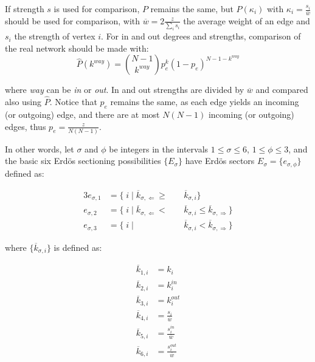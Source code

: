 \documentclass[%
 aip,
 jmp,%
 amsmath,amssymb,
 reprint,%
]{revtex4-1}
\begin{document}
If strength $s$ is used for comparison, $P$ remains the same, but $P(\kappa_i)$ with $\kappa_i=\frac{s_i}{\overline{w}}$ should be used for comparison, with $\overline{w}=2\frac{z}{\sum_is_i}$ the average weight of an edge and $s_i$ the strength of vertex $i$. For in and out degrees and strengths, comparison of the real network should be made with:
\begin{equation}
\hat{P}(k^{way})=\binom{N-1}{k^{way}}p_e^k(1-p_e)^{N-1-k^{way}}
\end{equation}

\noindent where \emph{way} can be \emph{in} or \emph{out}. In and out strengths are divided by $\overline{w}$ and compared also using $\hat{P}$. Notice that $p_e$ remains the same, as each edge yields an incoming (or outgoing) edge, and there are at most $N(N-1)$ incoming (or outgoing) edges, thus $p_e=\frac{z}{N(N-1)}$.

In other words, let $\sigma$ and $\phi$ be integers in the intervals $1 \leq \sigma \leq 6$, $1 \leq \phi \leq 3$, and the basic six Erd\"os sectioning possibilities $\{E_{\sigma}\}$ have Erd\"os sectors $E_{\sigma}= \{e_{\sigma, \phi} \}$ defined as:

\begin{alignat}{3}
e_{\sigma,1}&=\{\;i\;|\;\overline{k}_{\sigma,\Leftarrow}\geq&&\overline{k}_{\sigma,i}\} \\
e_{\sigma,2}&=\{\;i\;|\;\overline{k}_{\sigma,\Leftarrow}<\;&&\overline{k}_{\sigma,i}\leq\overline{k}_{\sigma,\Rightarrow}\} \\ 
e_{\sigma,3}&=\{\;i\;|\;&&\overline{k}_{\sigma,i}<\overline{k}_{\sigma,\Rightarrow}\}
\end{alignat}

\noindent where $\{\overline{k}_{\sigma,i}\}$ is defined as:

\begin{equation}
\begin{split}
\overline{k}_{1,i}&=k_i \\
\overline{k}_{2,i}&=k_i^{in} \\
\overline{k}_{3,i}&=k_i^{out} \\
\overline{k}_{4,i}&=\frac{s_i}{\overline{w}} \\
\overline{k}_{5,i}&=\frac{s_i^{in}}{\overline{w}} \\
\overline{k}_{6,i}&=\frac{s_i^{out}}{\overline{w}} \\
\end{split}
\end{equation}
\end{document}
